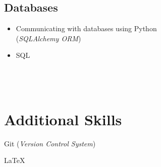 \documentclass[a4paper, 13pt, draft]{article}
\begin{document}
\begin{multicols}{2}
\subsection*{Databases}

\begin{itemize}
    \setlength\itemsep{0em}
\item Communicating with databases using Python \\ (\textit{SQLAlchemy ORM})
\item SQL \\ \\ \\ \\
\end{itemize}
\end{multicols}

\section*{\color{col1} Additional Skills \color{default}}

\begin{itemize}
    \begin{multicols}{2}
    \item Git (\textit{Version Control System})
    \item \LaTeX
    \end{multicols}
\end{itemize}
\end{document}
